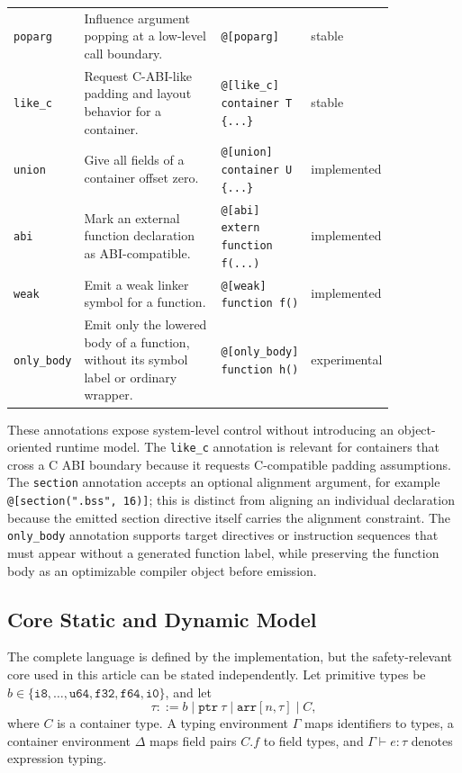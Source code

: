 \documentclass[10pt,twocolumn]{article}
\begin{document}
\begin{table}[t]
\begin{tabular}{p{0.12\linewidth}p{0.38\linewidth}p{0.22\linewidth}p{0.12\linewidth}}
\texttt{poparg}            & Influence argument popping at a low-level call boundary. & \texttt{@[poparg]} & stable \\
\texttt{like\_c}           & Request C-ABI-like padding and layout behavior for a container. & \texttt{@[like\_c] container T \{...\}} & stable \\
\texttt{union}             & Give all fields of a container offset zero. & \texttt{@[union] container U \{...\}} & implemented \\
\texttt{abi}               & Mark an external function declaration as ABI-compatible. & \texttt{@[abi] extern function f(...)} & implemented \\
\texttt{weak}              & Emit a weak linker symbol for a function. & \texttt{@[weak] function f()} & implemented \\
\texttt{only\_body}        & Emit only the lowered body of a function, without its symbol label or ordinary wrapper. & \texttt{@[only\_body] function h()} & experimental \\
\bottomrule
\end{tabular}
\end{table}

\par These annotations expose system-level control without introducing an object-oriented runtime model. The \texttt{like\_c} annotation is relevant for containers that cross a C ABI boundary because it requests C-compatible padding assumptions. The \texttt{section} annotation accepts an optional alignment argument, for example \texttt{@[section(".bss", 16)]}; this is distinct from aligning an individual declaration because the emitted section directive itself carries the alignment constraint. The \texttt{only\_body} annotation supports target directives or instruction sequences that must appear without a generated function label, while preserving the function body as an optimizable compiler object before emission.

\subsection{Core Static and Dynamic Model}
\label{sec:formal-core}

\par The complete language is defined by the implementation, but the safety-relevant core used in this article can be stated independently. Let primitive types be \(b \in \{\texttt{i8},\ldots,\texttt{u64},\texttt{f32},\texttt{f64},\texttt{i0}\}\), and let
\[
\tau ::= b \mid \texttt{ptr}\ \tau \mid \texttt{arr}[n,\tau] \mid C,
\]
where \(C\) is a container type. A typing environment \(\Gamma\) maps identifiers to types, a container environment \(\Delta\) maps field pairs \(C.f\) to field types, and \(\Gamma \vdash e : \tau\) denotes expression typing.
\end{document}
